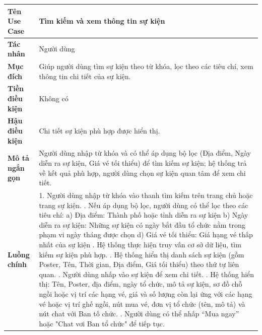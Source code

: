 \begin{table}[H]
\centering
\renewcommand{\arraystretch}{1.3}
\setlength{\tabcolsep}{8pt}
\begin{tabularx}{\textwidth}{|l|X|}
\hline
\textbf{Tên Use Case} & Tìm kiếm và xem thông tin sự kiện \\ \hline
\textbf{Tác nhân} & Người dùng \\ \hline
\textbf{Mục đích} & Giúp người dùng tìm sự kiện theo từ khóa, lọc theo các tiêu chí, xem thông tin chi tiết của sự kiện. \\ \hline
\textbf{Tiền điều kiện} & Không có \\ \hline
\textbf{Hậu điều kiện} & Chi tiết sự kiện phù hợp được hiển thị. \\ \hline
\textbf{Mô tả ngắn gọn} & Người dùng nhập từ khóa và có thể áp dụng bộ lọc (Địa điểm, Ngày diễn ra sự kiện, Giá vé tối thiểu) để tìm kiếm sự kiện; hệ thống trả về kết quả phù hợp, người dùng chọn sự kiện quan tâm để xem chi tiết. \\ \hline
\textbf{Luồng chính} &
1. Người dùng nhập từ khóa vào thanh tìm kiếm trên trang chủ hoặc trang sự kiện. \newline
2. Nếu áp dụng bộ lọc, người dùng có thể lọc theo các tiêu chí: \newline
\hspace*{1em}a) Địa điểm: Thành phố hoặc tỉnh diễn ra sự kiện \newline
\hspace*{1em}b) Ngày diễn ra sự kiện: Những sự kiện có ngày bắt đầu tổ chức nằm trong phạm vi ngày tháng được chọn \newline
\hspace*{1em}d) Giá vé tối thiểu: Giá hạng vé thấp nhất của sự kiện \newline
3. Hệ thống thực hiện truy vấn cơ sở dữ liệu, tìm kiếm sự kiện phù hợp. \newline
4. Hệ thống hiển thị danh sách sự kiện (gồm Poster, Tên, Thời gian, Địa điểm, Giá tối thiểu) theo thứ tự liên quan. \newline
5. Người dùng nhấp vào sự kiện để xem chi tiết. \newline
6. Hệ thống hiển thị: Tên, Poster, địa điểm, ngày tổ chức, mô tả sự kiện, sơ đồ chỗ ngồi hoặc vị trí các hạng vé, giá và số lượng còn lại ứng với các hạng vé hoặc vị trí ghế ngồi, nút mua vé, đơn vị tổ chức (tên, mô tả) và nút chat với Ban tố chức. \newline
7. Người dùng có thể nhấp “Mua ngay” hoặc "Chat vơi Ban tổ chức" để tiếp tục. \\ \hline

\end{tabularx}
\end{table}

